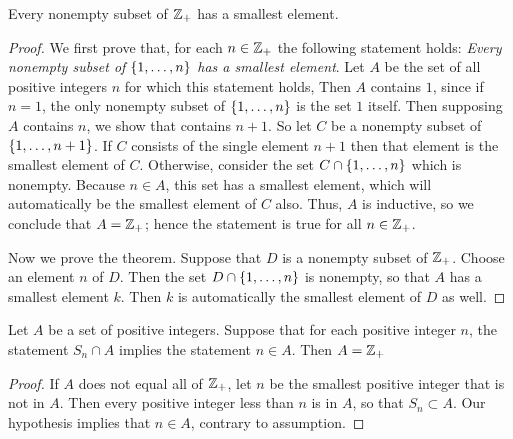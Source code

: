 \begin{thm}
	Every nonempty subset of $ \mathbb{Z}_+ $ has a smallest element.
\end{thm}
\begin{proof}
	We first prove that, for each $ n \in \mathbb{Z}_+ $ the following statement holds: \textit{Every nonempty subset of $ \left\lbrace 1, \ldots, n \right\rbrace $ has a smallest element}.
	Let $ A $ be the set of all positive integers $ n $ for which this statement holds, Then $ A $ contains $ 1 $, since if $ n = 1 $, the only nonempty subset of $ \left\lbrace 1,\ldots,n \right\rbrace $ is the set $ 1 $ itself. Then supposing $ A $ contains $ n $, we show that contains $ n+1 $. So let $ C $ be a nonempty subset of $ \left\lbrace 1, \ldots, n +1  \right\rbrace $. If $ C $ consists of the single element $ n+1 $ then that element is the smallest element of $ C $. Otherwise, consider the set $ C \cap \left\lbrace 1, \ldots,n \right\rbrace $ which is nonempty. Because $ n \in A $, this set has a smallest element, which will automatically be the smallest element of $ C $ also. Thus, $ A $ is inductive, so we conclude that $  A = \mathbb{Z}_+ $; hence the statement is true for all $ n \in \mathbb{Z}_+ $.
	
	Now we prove the theorem. Suppose that $ D $ is a nonempty subset of $ \mathbb{Z}_+ $. Choose an element $ n $ of $ D $. Then the set $ D \cap \left\lbrace 1, \ldots, n \right\rbrace $ is nonempty, so that $ A $ has a smallest element $ k $. Then $ k $ is automatically the smallest element of $ D $ as well.
\end{proof}

\begin{thm}
	Let $ A $ be a set of positive integers. Suppose that for each positive integer $ n $, the statement $ S_n \cap A $ implies the statement $ n \in A $. Then $ A = \mathbb{Z}_+ $
\end{thm}

\begin{proof}
	If $ A $ does not equal all  of $ \mathbb{Z}_+ $, let $ n $ be the smallest positive integer that is not in $ A $. Then every positive integer less than $ n $ is in $ A $, so that $ S_n \subset A $. Our hypothesis implies that $ n \in A $, contrary to assumption.
\end{proof}

